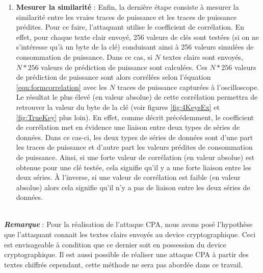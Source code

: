 \documentclass[oneside]{book}
\begin{document}
\begin{enumerate}
\item \textbf{Mesurer la similarité} : Enfin, la dernière étape consiste à mesurer la similarité entre les vraies traces de puissance et les traces de puissance prédites. Pour ce faire, l'attaquant utilise le coefficient de corrélation. En effet, pour chaque texte clair envoyé, 256 valeurs de clés sont testées (si on ne s'intéresse qu'à un byte de la clé) conduisant ainsi à 256 valeurs simulées de consommation de puissance. Dans ce cas, si $N$ textes clairs sont envoyés, $N*256$ valeurs de prédiction de puissance sont calculées. Ces $N*256$ valeurs de prédiction de puissance sont alors corrélées selon l'équation \ref{eqn:formcorrelation} avec les $N$ traces de puissance capturées à l'oscilloscope. Le résultat le plus élevé (en valeur absolue) de cette corrélation permettra de retrouver la valeur du byte de la clé (voir figures \ref{fig:4KeysEx} et \ref{fig:TrueKey} plus loin). En effet, comme décrit précédemment, le coefficient de corrélation met en évidence une liaison entre deux types de séries de données. Dans ce cas-ci, les deux types de séries de données sont d'une part les traces de puissance et d'autre part les valeurs prédites de consommation de puissance. Ainsi, si une forte valeur de corrélation (en valeur absolue) est obtenue pour une clé testée, cela signifie qu'il y a une forte liaison entre les deux séries. À l'inverse, si une valeur de corrélation est faible (en valeur absolue) alors cela signifie qu'il n'y a pas de liaison entre les deux séries de données. \\ \\
\end{enumerate}

\hspace{-0.5 cm}\textbf{\textit{Remarque}} : Pour la réalisation de l'attaque CPA, nous avons posé l'hypothèse que l'attaquant connait les textes clairs envoyés au device cryptographique. Ceci est envisageable à condition que ce dernier soit en possession du device cryptographique. Il est aussi possible de réaliser une attaque CPA à partir des textes chiffrés cependant, cette méthode ne sera pas abordée dans ce travail.

\newpage
\end{document}
